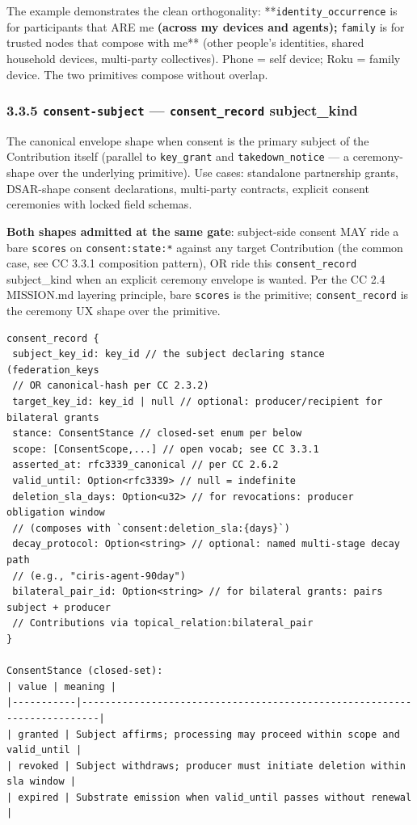 \documentclass[11pt]{article}
\begin{document}
The example demonstrates the clean orthogonality: **\texttt{identity\_occurrence} is for participants that ARE me\textbf{ (across my devices and agents); }\texttt{family} is for trusted nodes that compose with me** (other people's identities, shared household devices, multi-party collectives). Phone = self device; Roku = family device. The two primitives compose without overlap.


\subsubsection*{3.3.5 \texttt{consent-subject} — \texttt{consent\_record} subject\_kind}


The canonical envelope shape when consent is the primary subject of the Contribution itself (parallel to \texttt{key\_grant} and \texttt{takedown\_notice} — a ceremony-shape over the underlying primitive). Use cases: standalone partnership grants, DSAR-shape consent declarations, multi-party contracts, explicit consent ceremonies with locked field schemas.


\textbf{Both shapes admitted at the same gate}: subject-side consent MAY ride a bare \texttt{scores} on \texttt{consent:state:*} against any target Contribution (the common case, see CC 3.3.1 composition pattern), OR ride this \texttt{consent\_record} subject\_kind when an explicit ceremony envelope is wanted. Per the CC 2.4 MISSION.md layering principle, bare \texttt{scores} is the primitive; \texttt{consent\_record} is the ceremony UX shape over the primitive.


\begin{lstlisting}
consent_record {
 subject_key_id: key_id // the subject declaring stance (federation_keys
 // OR canonical-hash per CC 2.3.2)
 target_key_id: key_id | null // optional: producer/recipient for bilateral grants
 stance: ConsentStance // closed-set enum per below
 scope: [ConsentScope,...] // open vocab; see CC 3.3.1
 asserted_at: rfc3339_canonical // per CC 2.6.2
 valid_until: Option<rfc3339> // null = indefinite
 deletion_sla_days: Option<u32> // for revocations: producer obligation window
 // (composes with `consent:deletion_sla:{days}`)
 decay_protocol: Option<string> // optional: named multi-stage decay path
 // (e.g., "ciris-agent-90day")
 bilateral_pair_id: Option<string> // for bilateral grants: pairs subject + producer
 // Contributions via topical_relation:bilateral_pair
}

ConsentStance (closed-set):
| value | meaning |
|-----------|-------------------------------------------------------------------------|
| granted | Subject affirms; processing may proceed within scope and valid_until |
| revoked | Subject withdraws; producer must initiate deletion within sla window |
| expired | Substrate emission when valid_until passes without renewal |
\end{lstlisting}
\end{document}
